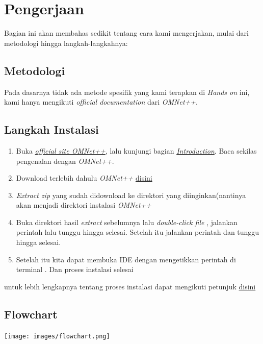 \documentclass[conference]{IEEEtran}
\begin{document}
\section{Pengerjaan}\label{pengerjaan}
Bagian ini akan membahas sedikit tentang cara kami mengerjakan, mulai dari metodologi hingga langkah-langkahnya:

\subsection{Metodologi}
Pada dasarnya tidak ada metode spesifik yang kami terapkan di \textit{Hands on} ini, kami hanya mengikuti \textit{official documentation} dari \textit{OMNet++}.

\subsection{Langkah Instalasi}
\begin{enumerate}
	\item Buka \href{https://omnetpp.org/}{\textit{official site OMNet++}}, lalu kunjungi bagian \href{https://omnetpp.org/intro}{\textit{Introduction}}. Baca sekilas pengenalan dengan \textit{OMNet++}.
	\item Download terlebih dahulu \textit{OMNet++} \href{https://omnetpp.org/download/}{disini}
	\item \textit{Extract zip} yang sudah didownload ke direktori yang diinginkan(nantinya akan menjadi direktori instalasi \textit{OMNet++}
	\item Buka direktori hasil \textit{extract} sebelumnya lalu \textit{double-click file} , jalankan perintah  lalu tunggu hingga selesai. Setelah itu jalankan perintah  dan tunggu hingga selesai.
	\item Setelah itu kita dapat membuka IDE dengan mengetikkan perintah  di terminal . Dan proses instalasi selesai
\end{enumerate}

untuk lebih lengkapnya tentang proses instalasi dapat mengikuti petunjuk \href{https://doc.omnetpp.org/omnetpp/InstallGuide.pdf}{disini}


\subsection{Flowchart}

\texttt{[image: images/flowchart.png]}
\break
\end{document}
